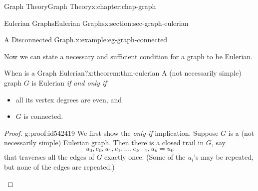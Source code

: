 \documentclass[oneside,10pt,]{book}
\numberwithin{equation}{section}
\begin{document}
\begin{chapterptx}{Graph Theory}{}{Graph Theory}{}{}{x:chapter:chap-graph}
\begin{sectionptx}{Eulerian Graphs}{}{Eulerian Graphs}{}{}{x:section:sec-graph-eulerian}
\begin{example}{A Disconnected Graph.}{x:example:eg-graph-connected}
\begin{sidebyside}{1}{0.415}{0.415}{0}
\begin{sbspanel}{0.17}
{
}%
\end{sbspanel}%
\end{sidebyside}%
\end{example}
Now we can state a necessary and sufficient condition for a graph to be Eulerian.%
\begin{theorem}{When is a Graph Eulerian?}{}{x:theorem:thm-eulerian}%
A (not necessarily simple) graph \(G\) is Eulerian \emph{if and only if}%
\begin{itemize}[label=\textbullet]
\item{}all its vertex degrees are even, and%
\item{}\(G\) is connected.%
\end{itemize}
%
\end{theorem}
\begin{proof}{}{g:proof:id542419}
We first show the \emph{only if} implication. Suppose \(G\) is a (not necessarily simple) Eulerian graph. Then there is a closed trail in \(G\), say%
\begin{equation*}
u_0, e_0, u_1, e_1, \ldots, e_{k-1}, u_k = u_0
\end{equation*}
that traverses all the edges of \(G\) exactly once. (Some of the \(u_i\)'s may be repeated, but none of the edges are repeated.)%
\begin{sidebyside}{1}{0.275}{0.275}{0}%
\begin{sbspanel}{0.45}%
\resizebox{\linewidth}{!}{%
			\begin{tikzpicture}[scale=0.7]

\end{tikzpicture}}
\end{sbspanel}
\end{sidebyside}
\end{proof}
\end{sectionptx}
\end{chapterptx}
\end{document}
